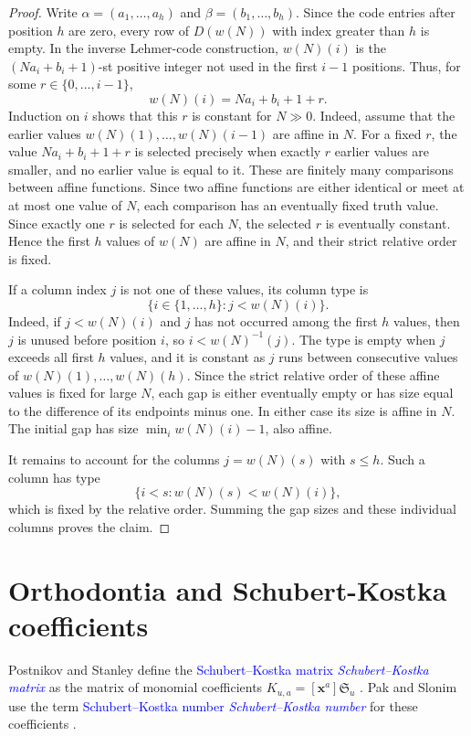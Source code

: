 \documentclass[11pt,reqno]{amsart}
\theoremstyle{definition}
\newcommand{\xvec}{\mathbf{x}}
\newcommand{\schubertS}{\mathfrak{S}}
\newcommand{\defin}[1]{%
  \relax\ifmmode%
  \textcolor{blue}{#1}%
  \else\textcolor{blue}{\emph{#1}}%
  \fi%
}
\begin{document}
\begin{proof}
Write \(\alpha=(a_1,\dotsc,a_h)\) and
\(\beta=(b_1,\dotsc,b_h)\).  Since the code entries after position \(h\)
are zero, every row of \(D(w(N))\) with index greater than \(h\) is empty.
In the inverse Lehmer-code construction, \(w(N)(i)\) is the
\((Na_i+b_i+1)\)-st positive integer not used in the first \(i-1\) positions.
Thus, for some \(r\in\{0,\dotsc,i-1\}\),
\[
w(N)(i)=Na_i+b_i+1+r.
\]
Induction on \(i\) shows that this \(r\) is constant for \(N\gg0\).  Indeed,
assume that the earlier values \(w(N)(1),\dotsc,w(N)(i-1)\) are affine in
\(N\).  For a fixed \(r\), the value \(Na_i+b_i+1+r\) is selected precisely
when exactly \(r\) earlier values are smaller, and no earlier value is equal
to it.  These are finitely many comparisons between affine functions.  Since
two affine functions are either identical or meet at at most one value of
\(N\), each comparison has an eventually fixed truth value.  Since exactly
one \(r\) is selected for each \(N\), the selected \(r\) is eventually
constant.  Hence the first \(h\) values of \(w(N)\) are affine in \(N\), and
their strict relative order is fixed.

If a column index \(j\) is not one of these values, its column type is
\[
\{i\in\{1,\dotsc,h\}:j<w(N)(i)\}.
\]
Indeed, if \(j<w(N)(i)\) and \(j\) has not occurred among the first \(h\)
values, then \(j\) is unused before position \(i\), so \(i<w(N)^{-1}(j)\).
The type is empty when \(j\) exceeds all first \(h\) values, and it is
constant as \(j\) runs between consecutive values of
\(w(N)(1),\dotsc,w(N)(h)\).  Since the strict relative order of these affine
values is fixed for large \(N\), each gap is either eventually empty or has
size equal to the difference of its endpoints minus one.  In either case its
size is affine in \(N\).  The initial gap has size
\(\min_i w(N)(i)-1\), also affine.

It remains to account for the columns \(j=w(N)(s)\) with \(s\leq h\).  Such a
column has type
\[
\{i<s:w(N)(s)<w(N)(i)\},
\]
which is fixed by the relative order.  Summing the gap sizes and these
individual columns proves the claim.
\end{proof}

\section{Orthodontia and Schubert-Kostka coefficients}
\label{sec:orthodontia}

Postnikov and Stanley define the \defin{Schubert--Kostka matrix} as the matrix
of monomial coefficients \(K_{u,a}=[\xvec^a]\schubertS_u\)
\cite[Sec.~17]{PostnikovStanley2008}.  Pak and Slonim use the term
\defin{Schubert--Kostka number} for these coefficients
\cite[Sec.~2.6]{PakSlonim2026x}.
\end{document}
